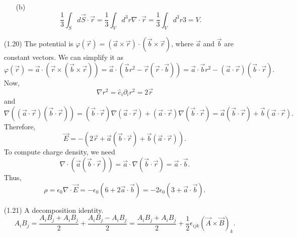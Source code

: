 \documentclass{article}
\begin{document}
\begin{enumerate}
\begin{enumerate}
\item[(b)] 
\[
\frac{1}{3}\int_S d\vec{S}\cdot\vec{r} = \frac{1}{3}\int_V d^3r 
\nabla\cdot\vec{r} = \frac{1}{3}\int_V d^3r 3 = V.
\]
\end{enumerate}

\item[(1.20)] The potential is $\varphi(\vec{r}) = (\vec{a} \times \vec{r})
\cdot (\vec{b} \times \vec{r})$, where $\vec{a}$ and $\vec{b}$ are constant
vectors. We can simplify it as
\[
\varphi(\vec{r}) = \vec{a}\cdot(\vec{r} \times (\vec{b} \times \vec{r})) = 
\vec{a}\cdot(\vec{b}r^2 - \vec{r}(\vec{r}\cdot\vec{b})) = \vec{a}\cdot\vec{b}
r^2 - (\vec{a}\cdot\vec{r})(\vec{b}\cdot\vec{r}).
\]
Now,
\[
\nabla r^2 = \hat{e}_i\partial_i r^2 = 2\vec{r}
\]
and
\[
\nabla ((\vec{a}\cdot\vec{r})(\vec{b}\cdot\vec{r})) = (\vec{b}\cdot\vec{r})
\nabla (\vec{a}\cdot\vec{r}) + (\vec{a}\cdot\vec{r})\nabla(\vec{b}\cdot\vec{r})
= \vec{a}(\vec{b}\cdot\vec{r}) + \vec{b}(\vec{a}\cdot\vec{r}). 
\]
Therefore,
\[
\vec{E} = -(2\vec{r} + \vec{a}(\vec{b}\cdot\vec{r}) + \vec{b}(\vec{a}\cdot\vec{r})).
\]
To compute charge density, we need
\[
\nabla\cdot(\vec{a}(\vec{b}\cdot\vec{r})) = 
\vec{a}\cdot\nabla(\vec{b}\cdot\vec{r}) = \vec{a}\cdot\vec{b}.
\]
Thus,
\[
\rho = \epsilon_0\nabla\cdot\vec{E} = -\epsilon_0(6 + 2\vec{a}\cdot\vec{b}) = 
-2\epsilon_0(3 + \vec{a}\cdot\vec{b}).
\]

\item[(1.21)] A decomposition identity.
\[
A_iB_j = \frac{A_iB_j + A_iB_j}{2} + \frac{A_iB_j - A_iB_j}{2}
= \frac{A_iB_j + A_iB_j}{2} + \frac{1}{2}\epsilon_{ijk}(\vec{A}\times\vec{B})_k.
\]
\end{enumerate}
\end{document}
